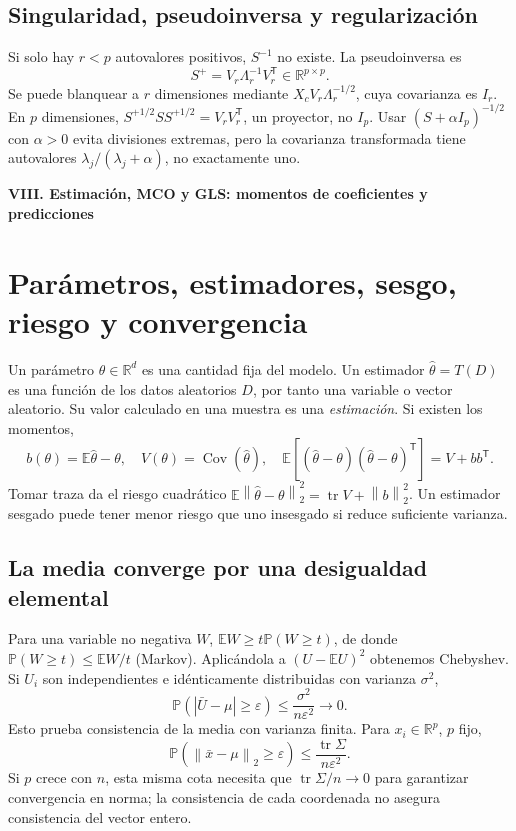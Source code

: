 \documentclass[11pt,a4paper]{article}
\newcommand{\R}{\mathbb R}
\newcommand{\E}{\mathbb E}
\newcommand{\Prob}{\mathbb P}
\newcommand{\T}{^{\mathsf T}}
\newcommand{\norm}[1]{\left\lVert #1\right\rVert}
\DeclareMathOperator{\Cov}{Cov}
\DeclareMathOperator{\tr}{tr}
\theoremstyle{definition}
\newcommand{\parte}[1]{\par\bigskip\Needspace{8\baselineskip}\begin{center}{\Large\bfseries\color{azul}#1}\end{center}}
\begin{document}
\subsection{Singularidad, pseudoinversa y regularización}
Si solo hay $r<p$ autovalores positivos, $S^{-1}$ no existe. La pseudoinversa es
\[
S^+=V_r\Lambda_r^{-1}V_r\T\in\R^{p\times p}.
\]
Se puede blanquear a $r$ dimensiones mediante $X_cV_r\Lambda_r^{-1/2}$, cuya covarianza es $I_r$. En $p$ dimensiones, $S^{+1/2}SS^{+1/2}=V_rV_r\T$, un proyector, no $I_p$. Usar $(S+\alpha I_p)^{-1/2}$ con $\alpha>0$ evita divisiones extremas, pero la covarianza transformada tiene autovalores $\lambda_j/(\lambda_j+\alpha)$, no exactamente uno.

\parte{VIII. Estimación, MCO y GLS: momentos de coeficientes y predicciones}
\section{Parámetros, estimadores, sesgo, riesgo y convergencia}
Un parámetro $\theta\in\R^d$ es una cantidad fija del modelo. Un estimador $\widehat\theta=T(D)$ es una función de los datos aleatorios $D$, por tanto una variable o vector aleatorio. Su valor calculado en una muestra es una \emph{estimación}. Si existen los momentos,
\[
b(\theta)=\E\widehat\theta-\theta,\quad
V(\theta)=\Cov(\widehat\theta),\quad
\E[(\widehat\theta-\theta)(\widehat\theta-\theta)\T]=V+bb\T.
\]
Tomar traza da el riesgo cuadrático $\E\norm{\widehat\theta-\theta}_2^2=\tr V+\norm b_2^2$. Un estimador sesgado puede tener menor riesgo que uno insesgado si reduce suficiente varianza.
\subsection{La media converge por una desigualdad elemental}
Para una variable no negativa $W$, $\E W\ge t\Prob(W\ge t)$, de donde $\Prob(W\ge t)\le\E W/t$ (Markov). Aplicándola a $(U-\E U)^2$ obtenemos Chebyshev. Si $U_i$ son independientes e idénticamente distribuidas con varianza $\sigma^2$,
\[
\Prob(|\bar U-\mu|\ge\varepsilon)\le\frac{\sigma^2}{n\varepsilon^2}\to0.
\]
Esto prueba consistencia de la media con varianza finita. Para $x_i\in\R^p$, $p$ fijo,
\[
\Prob(\norm{\bar x-\mu}_2\ge\varepsilon)
\le\frac{\tr\Sigma}{n\varepsilon^2}.
\]
Si $p$ crece con $n$, esta misma cota necesita que $\tr\Sigma/n\to0$ para garantizar convergencia en norma; la consistencia de cada coordenada no asegura consistencia del vector entero.
\end{document}
